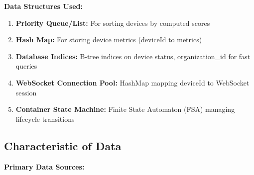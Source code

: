\documentclass[12pt,a4paper]{article}
\begin{document}
\textbf{Data Structures Used:}

\begin{enumerate}[noitemsep]
    \item \textbf{Priority Queue/List:} For sorting devices by computed scores
    \item \textbf{Hash Map:} For storing device metrics (deviceId to metrics)
    \item \textbf{Database Indices:} B-tree indices on device status, organization\_id for fast queries
    \item \textbf{WebSocket Connection Pool:} HashMap mapping deviceId to WebSocket session
    \item \textbf{Container State Machine:} Finite State Automaton (FSA) managing lifecycle transitions
\end{enumerate}

\subsection{Characteristic of Data}

\textbf{Primary Data Sources:}
\end{document}
